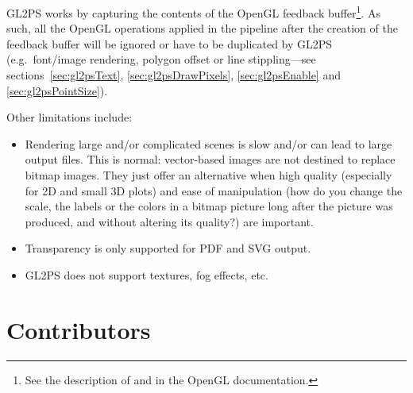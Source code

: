 GL2PS works by capturing the contents of the OpenGL feedback
buffer\footnote{See the description of  and
 in the OpenGL documentation.}. As such, all
the OpenGL operations applied in the pipeline after the creation of the
feedback buffer will be ignored or have to be duplicated by GL2PS (e.g.\
font/image rendering, polygon offset or line stippling---see
sections~\ref{sec:gl2psText}, \ref{sec:gl2psDrawPixels},
\ref{sec:gl2psEnable} and \ref{sec:gl2psPointSize}).

Other limitations include:
\begin{itemize}
\item
Rendering large and/or complicated scenes is slow and/or can lead to large
output files. This is normal: vector-based images are not destined to
replace bitmap images. They just offer an alternative when high quality
(especially for 2D and small 3D plots) and ease of manipulation (how do you
change the scale, the labels or the colors in a bitmap picture long after
the picture was produced, and without altering its quality?) are important.
\item
Transparency is only supported for PDF and SVG output.
\item
GL2PS does not support textures, fog effects, etc.
\end{itemize}

%
%
%
%
%
%
%

\section{Contributors}
\label{sec:contrib}


